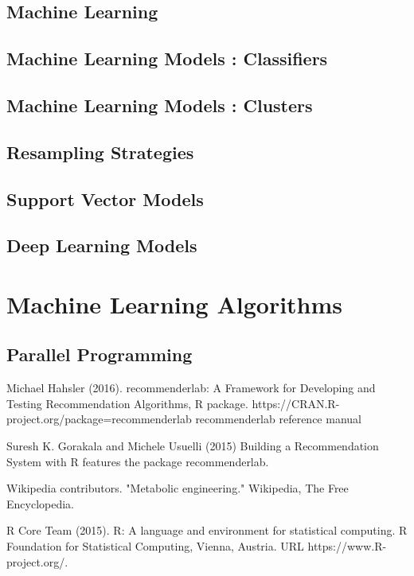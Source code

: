
\begin{thebibliography}{00}

\subsection{Machine Learning}

\subsection{Machine Learning Models : Classifiers}

\subsection{Machine Learning Models : Clusters}

\subsection{Resampling Strategies}

\subsection{Support Vector Models}

\subsection{Deep Learning Models}

\section{Machine Learning Algorithms}

\subsection{Parallel Programming}


Michael Hahsler (2016). 
\newblock recommenderlab: A Framework for Developing and Testing Recommendation Algorithms, 
\newblock R package. https://CRAN.R-project.org/package=recommenderlab recommenderlab reference manual

Suresh K. Gorakala and Michele Usuelli (2015) 
\newblock Building a Recommendation System with R features the package recommenderlab.

Wikipedia contributors. 
\newblock "Metabolic engineering." 
\newblock Wikipedia, The Free Encyclopedia.  

R Core Team (2015). 
\newblock R: A language and environment for statistical computing. R Foundation for Statistical Computing, Vienna, Austria.
\newblock URL https://www.R-project.org/.

\end{thebibliography}

